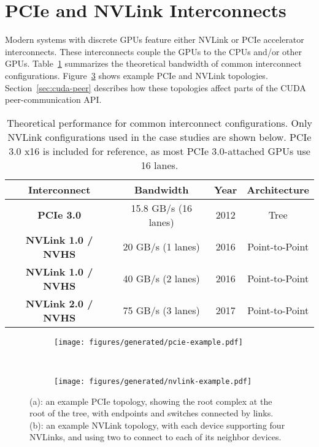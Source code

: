 \section{PCIe and NVLink Interconnects}
\label{sec:interconnects}

Modern systems with discrete GPUs feature either NVLink or PCIe accelerator interconnects.
These interconnects couple the GPUs to the CPUs and/or other GPUs.
Table~\ref{tab:interconnect-overview} summarizes the theoretical bandwidth of common interconnect configurations.
Figure~\ref{fig:interconnect-cartoon} shows example PCIe and NVLink topologies.
Section~\ref{sec:cuda-peer} describes how these topologies affect parts of the CUDA peer-communication API.

\begin{table}[ht]
	\centering
	\caption[Interconnect Performance Summary]{
		Theoretical performance for common interconnect configurations.
		Only NVLink configurations used in the case studies are shown below.
		PCIe 3.0 x16 is included for reference, as most PCIe 3.0-attached GPUs use 16 lanes.
	}
	\label{tab:interconnect-overview}
	\begin{tabular}{cccc}
		\hline
		\textbf{Interconnect}      & \textbf{Bandwidth}   & \textbf{Year} & \textbf{Architecture} \\ \hline
		\textbf{PCIe 3.0}          & 15.8 GB/s (16 lanes) & 2012          & Tree                  \\ \hline
		\textbf{NVLink 1.0 / NVHS} &   20 GB/s (1 lanes)  & 2016          & Point-to-Point        \\ \hline
		\textbf{NVLink 1.0 / NVHS} &   40 GB/s (2 lanes)  & 2016          & Point-to-Point        \\ \hline
		\textbf{NVLink 2.0 / NVHS} &   75 GB/s (3 lanes)  & 2017          & Point-to-Point        \\ \hline
	\end{tabular}
\end{table}

\begin{figure}[ht]
    \centering
	\begin{subfigure}[b]{0.4\textwidth}
		\texttt{[image: figures/generated/pcie-example.pdf]}
		\caption[]{}
		\label{fig:pcie-cartoon}
    \end{subfigure}
    ~
    \begin{subfigure}[b]{0.4\textwidth}
		\texttt{[image: figures/generated/nvlink-example.pdf]}
		\caption[]{}
		\label{fig:nvlink-cartoon}
    \end{subfigure}
    \caption[Example PCIe and NVLink interconnect topologies]{
		(a): an example PCIe topology, showing the root complex at the root of the tree, with endpoints and switches connected by links.
		(b): an example NVLink topology, with each device supporting four NVLinks, and using two to connect to each of its neighbor devices.
	}
    \label{fig:interconnect-cartoon}
\end{figure}

